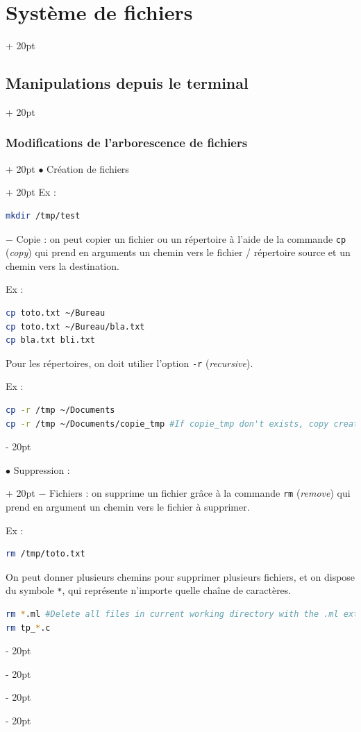 \documentclass[a4paper, 12pt, twoside]{article}
\renewcommand{\em}{\color{ff4500}}
\newcommand{\ind}[1][20pt]{\advance\leftskip + #1}
\newcommand{\deind}[1][20pt]{\advance\leftskip - #1}
\newenvironment{indentedenv}[1][20pt]{\par \ind[#1]}{\par \deind}
\newenvironment{indt}[2][20pt]{#2 \begin{indentedenv}[#1]}{\end{indentedenv}} %
\begin{document}
\begin{indt}{\section{Système de fichiers}}
\begin{indt}{\subsection{Manipulations depuis le terminal}}
\begin{indt}{\subsubsection{Modifications de l'arborescence de fichiers}}
\begin{indt}{$\bullet$ Création de fichiers}
                    Ex :
                    \begin{lstlisting}[language=Bash, xleftmargin=100pt]
mkdir /tmp/test\end{lstlisting}
                    
                    \vspace{12pt}
                    
                    $-$ Copie : on peut copier un fichier ou un répertoire à l'aide de la commande \texttt{\em cp} (\textit{copy}) qui prend en arguments un chemin vers le fichier / répertoire source et un chemin vers la destination.
                    
                    Ex :
                    \begin{lstlisting}[language=Bash, xleftmargin=100pt]
cp toto.txt ~/Bureau
cp toto.txt ~/Bureau/bla.txt
cp bla.txt bli.txt\end{lstlisting}
                    
                    Pour les répertoires, on doit utilier l'option \texttt{-r} (\textit{recursive}).
                    
                    Ex :
                    \begin{lstlisting}[language=Bash, xleftmargin=100pt]
cp -r /tmp ~/Documents
cp -r /tmp ~/Documents/copie_tmp #If copie_tmp don't exists, copy create copie_tmp in ~/Documents and /tmp/* in copie_tmp\end{lstlisting}
                \end{indt}
                
                \vspace{12pt}
                
                \begin{indt}{$\bullet$ Suppression :}
                    $-$ Fichiers : on supprime un fichier grâce à la commande \texttt{\em rm} (\textit{remove}) qui prend en argument un chemin vers le fichier à supprimer.
                    
                    Ex :
                    \begin{lstlisting}[language=Bash, xleftmargin=100pt]
rm /tmp/toto.txt\end{lstlisting}
                    
                    On peut donner plusieurs chemins pour supprimer plusieurs fichiers, et on dispose du symbole \texttt{*}, qui représente n'importe quelle chaîne de caractères.
                    \begin{lstlisting}[language=Bash, xleftmargin=100pt]
rm *.ml #Delete all files in current working directory with the .ml extension.
rm tp_*.c\end{lstlisting}
                    

\end{indt}
\end{indt}
\end{indt}
\end{indt}
\end{document}

